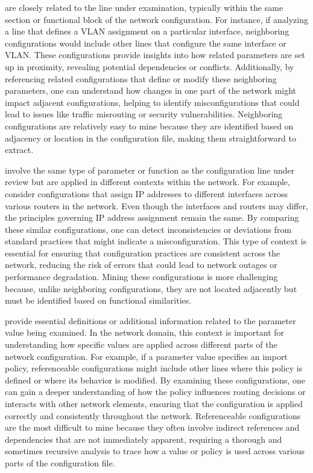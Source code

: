      are closely related to the line under examination, typically within the same section or functional block of the network configuration. For instance, if analyzing a line that defines a VLAN assignment on a particular interface, neighboring configurations would include other lines that configure the same interface or VLAN. These configurations provide insights into how related parameters are set up in proximity, revealing potential dependencies or conflicts. Additionally, by referencing related configurations that define or modify these neighboring parameters, one can understand how changes in one part of the network might impact adjacent configurations, helping to identify misconfigurations that could lead to issues like traffic misrouting or security vulnerabilities. Neighboring configurations are relatively easy to mine because they are identified based on adjacency or location in the configuration file, making them straightforward to extract.
        
     involve the same type of parameter or function as the configuration line under review but are applied in different contexts within the network. For example, consider configurations that assign IP addresses to different interfaces across various routers in the network. Even though the interfaces and routers may differ, the principles governing IP address assignment remain the same. By comparing these similar configurations, one can detect inconsistencies or deviations from standard practices that might indicate a misconfiguration. This type of context is essential for ensuring that configuration practices are consistent across the network, reducing the risk of errors that could lead to network outages or performance degradation. Mining these configurations is more challenging because, unlike neighboring configurations, they are not located adjacently but must be identified based on functional similarities.

    provide essential definitions or additional information related to the
    parameter value being examined. In the network domain, this context is
    important for understanding how specific values are applied across different parts of the network configuration. For example, if a parameter value specifies an import policy, referenceable configurations might include other lines where this policy is defined or where its behavior is modified. By examining these configurations, one can gain a deeper understanding of how the policy influences routing decisions or interacts with other network elements, ensuring that the configuration is applied correctly and consistently throughout the network.
    Referenceable configurations are the most difficult to mine because they often involve indirect references and dependencies that are not immediately apparent, requiring a thorough and sometimes recursive analysis to trace how a value or policy is used across various parts of the configuration file.

